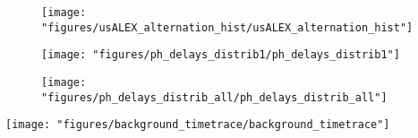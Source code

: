 

\usepackage[utf8]{inputenc}
\usepackage[LGR,T1]{fontenc}
\usepackage{textcomp}

\usepackage{fancyref}
\usepackage{hyperref}
\usepackage{cite}

\makeatletter
\newcommand{\verbatimfont}[1]{\renewcommand{\verbatim@font}{\ttfamily#1}}
\makeatother

\author{Antonino Ingargiola}
\title{}



\verbatimfont{\small}

\maketitle

\begin{abstract}

\end{abstract}

\tableofcontents




\begin{figure}
\begin{center}
\texttt{[image: "figures/usALEX\_alternation\_hist/usALEX\_alternation\_hist"]}
\caption[]{}
\end{center}
\end{figure}




\begin{figure}
\begin{center}
\texttt{[image: "figures/ph\_delays\_distrib1/ph\_delays\_distrib1"]}
\caption[]{}
\end{center}
\end{figure}

\begin{figure}
\begin{center}
\texttt{[image: "figures/ph\_delays\_distrib\_all/ph\_delays\_distrib\_all"]}
\caption[]{}
\end{center}
\end{figure}

\begin{figure*}
\begin{center}
\texttt{[image: "figures/background\_timetrace/background\_timetrace"]}
\caption[]{}
\end{center}
\end{figure*}



